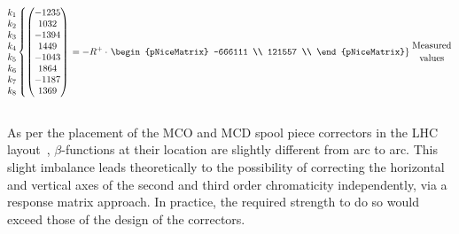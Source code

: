 \begin{equation}
    \begin{matrix}
      k_1 \\
      k_2 \\
      k_3 \\
      k_4 \\
      k_5 \\
      k_6 \\
      k_7 \\
      k_8 \\
    \end{matrix}
  \left\{
  \begin{pmatrix}
     -1235 \\
      1032   \\  
     -1394  \\ 
      1449   \\ 
     -1043  \\ 
      1864   \\ 
     -1187  \\ 
      1369   \\ 
  \end{pmatrix}
  \right.
  =
  -R^{+} 
  \cdot
  \left.
  \begin{pNiceMatrix}
      -666111 \\
      121557 \\
  \end{pNiceMatrix}
  \right\}
  {\genfrac{}{}{0pt}{0}{\text{Measured}}{\text{values}}}
  \label{eq:resp_matrix_inverse_example}
\end{equation}





\subsection{}


As per the placement of the MCO and MCD spool piece correctors in the LHC 
layout~\cite{maclean_commissioning_2016-1}, $\beta$-functions at their location are slightly
different from arc to arc. This slight imbalance leads theoretically to the possibility of
correcting the horizontal and vertical axes of the second and third order chromaticity
independently, via a response matrix approach. In practice, the required strength to do so would
exceed those of the design of the correctors.

